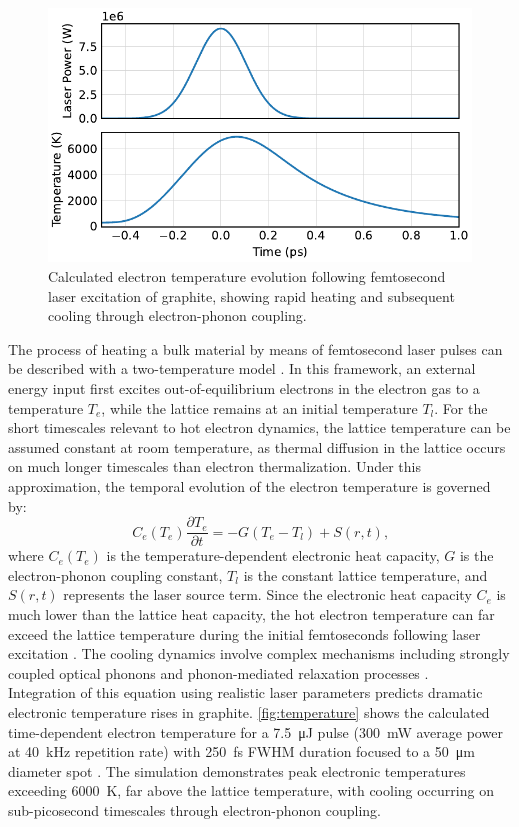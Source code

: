 \documentclass[
	parskip=half,
	a4paper,
]{scrarticle}
\begin{document}
\begin{figure}
    \centering
    \includegraphics{../analysis/figures/model te.pdf}
    \caption{Calculated electron temperature evolution following femtosecond laser excitation of graphite, showing rapid heating and subsequent cooling through electron-phonon coupling.}
    \label{fig:temperature}
\end{figure}
The process of heating a bulk material by means of femtosecond laser pulses can be described with a two-temperature model \cite{roob_thermal_2025}. In this framework, an external energy input first excites out-of-equilibrium electrons in the electron gas to a temperature $T_e$, while the lattice remains at an initial temperature $T_l$. For the short timescales relevant to hot electron dynamics, the lattice temperature can be assumed constant at room temperature, as thermal diffusion in the lattice occurs on much longer timescales than electron thermalization. Under this approximation, the temporal evolution of the electron temperature is governed by:
\begin{equation}
C_e(T_e) \frac{\partial T_e}{\partial t} = -G(T_e - T_l) + S(r,t)\text{,}
\end{equation}
where $C_e(T_e)$ is the temperature-dependent electronic heat capacity, $G$ is the electron-phonon coupling constant, $T_l$ is the constant lattice temperature, and $S(r,t)$ represents the laser source term. Since the electronic heat capacity $C_e$ is much lower than the lattice heat capacity, the hot electron temperature can far exceed the lattice temperature during the initial femtoseconds following laser excitation \cite{nihira_temperature_2003}. The cooling dynamics involve complex mechanisms including strongly coupled optical phonons \cite{kampfrath_strongly_2005} and phonon-mediated relaxation processes \cite{stange_hot_2015}.\\
Integration of this equation using realistic laser parameters predicts dramatic electronic temperature rises in graphite. \autoref{fig:temperature} shows the calculated time-dependent electron temperature for a \SI{7.5}{\micro J} pulse (\SI{300}{mW} average power at \SI{40}{kHz} repetition rate) with \SI{250}{fs} FWHM duration focused to a \SI{50}{\micro m} diameter spot \cite{roob_thermal_2025}. The simulation demonstrates peak electronic temperatures exceeding \SI{6000}{K}, far above the lattice temperature, with cooling occurring on sub-picosecond timescales through electron-phonon coupling.
\end{document}
